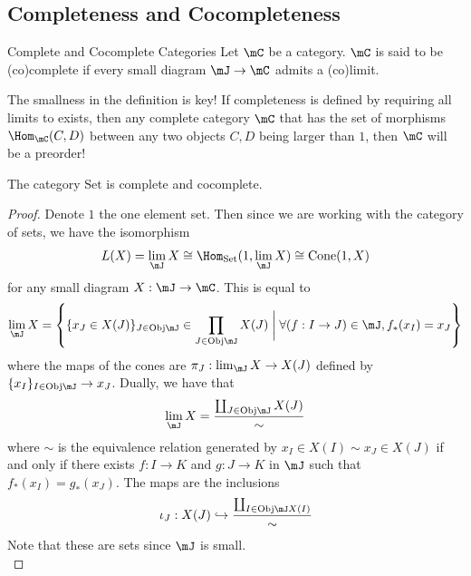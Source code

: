 \documentclass[a4paper]{article}
\begin{document}
\subsection{Completeness and Cocompleteness}
\begin{defn}{Complete and Cocomplete Categories}{} Let $\mC$ be a category. $\mC$ is said to be (co)complete if every small diagram $\mJ\to\mC$ admits a (co)limit. 
\end{defn}

The smallness in the definition is key! If completeness is defined by requiring all limits to exists, then any complete category $\mC$ that has the set of morphisms $\Hom_\mC(C,D)$ between any two objects $C,D$ being larger than $1$, then $\mC$
will be a preorder!

\begin{prp}{}{} The category $\text{Set}$ is complete and cocomplete. 
\begin{proof}
Denote $1$ the one element set. Then since we are working with the category of sets, we have the isomorphism $$L(X)=\lim_\mJ X\cong\Hom_\text{Set}(1,\lim_\mJ X)\cong\text{Cone}(1,X)$$ for any small diagram $X:\mJ\to\mC$. This is equal to $$\lim_\mJ X=\left\{\{x_J\in X(J)\}_{J\in\text{Obj}\mJ}\in\prod_{J\in\text{Obj}\mJ}X(J)\;\bigg{|}\;\forall (f:I\to J)\in\mJ, f_\ast(x_I)=x_J\right\}$$ where the maps of the cones are $\pi_J:\lim_\mJ X\to X(J)$ defined by $\{x_I\}_{I\in\text{Obj}\mJ}\to x_J$. Dually, we have that $$\lim_\mJ X=\frac{\coprod_{J\in\text{Obj}\mJ}X(J)}{\sim}$$ where $\sim$ is the equivalence relation generated by $x_I\in X(I)\sim x_J\in X(J)$ if and only if there exists $f:I\to K$ and $g:J\to K$ in $\mJ$ such that $f_\ast(x_I)=g_\ast(x_J)$. The maps are the inclusions $$\iota_J:X(J)\hookrightarrow\frac{\coprod_{I\in\text{Obj}\mJ X(I)}}{\sim}$$ Note that these are sets since $\mJ$ is small. \\


\end{proof}
\end{prp}
\end{document}
